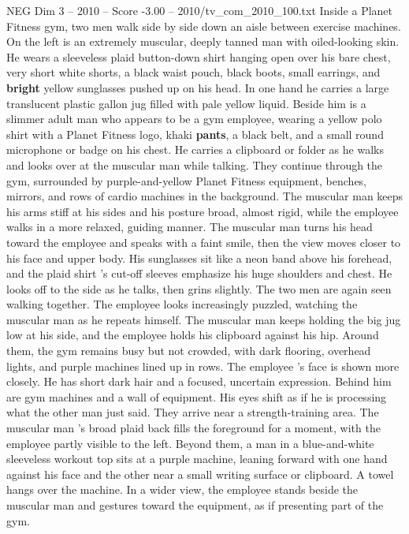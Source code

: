 \begin{textsample}{NEG Dim 3 – 2010 – Score -3.00 – 2010/tv\_com\_2010\_100.txt}  \label{ex:f3_neg_004}
Inside a Planet Fitness gym, two men walk side by side down an aisle between exercise machines.
On the left is an extremely muscular, deeply tanned man with oiled-looking skin.
He wears a sleeveless plaid button-down shirt hanging open over his bare chest, very short white shorts, a black waist pouch, black boots, small earrings, and \textbf{bright} yellow sunglasses pushed up on his head.
In one hand he carries a large translucent plastic gallon jug filled with pale yellow liquid.
Beside him is a slimmer adult man who appears to be a gym employee, wearing a yellow polo shirt with a Planet Fitness logo, khaki \textbf{pants}, a black belt, and a small round microphone or badge on his chest.
He carries a clipboard or folder as he walks and looks over at the muscular man while talking.
They continue through the gym, surrounded by purple-and-yellow Planet Fitness equipment, benches, mirrors, and rows of cardio machines in the background.
The muscular man keeps his arms stiff at his sides and his posture broad, almost rigid, while the employee walks in a more relaxed, guiding manner.
The muscular man turns his head toward the employee and speaks with a faint smile, then the view moves closer to his face and upper body.
His sunglasses sit like a neon band above his forehead, and the plaid shirt ’s cut-off sleeves emphasize his huge shoulders and chest.
He looks off to the side as he talks, then grins slightly.
The two men are again seen walking together.
The employee looks increasingly puzzled, watching the muscular man as he repeats himself.
The muscular man keeps holding the big jug low at his side, and the employee holds his clipboard against his hip.
Around them, the gym remains busy but not crowded, with dark flooring, overhead lights, and purple machines lined up in rows.
The employee ’s face is shown more closely.
He has short dark hair and a focused, uncertain expression.
Behind him are gym machines and a wall of equipment.
His eyes shift as if he is processing what the other man just said.
They arrive near a strength-training area.
The muscular man ’s broad plaid back fills the foreground for a moment, with the employee partly visible to the left.
Beyond them, a man in a blue-and-white sleeveless workout top sits at a purple machine, leaning forward with one hand against his face and the other near a small writing surface or clipboard.
A towel hangs over the machine.
In a wider view, the employee stands beside the muscular man and gestures toward the equipment, as if presenting part of the gym.

\end{textsample}
